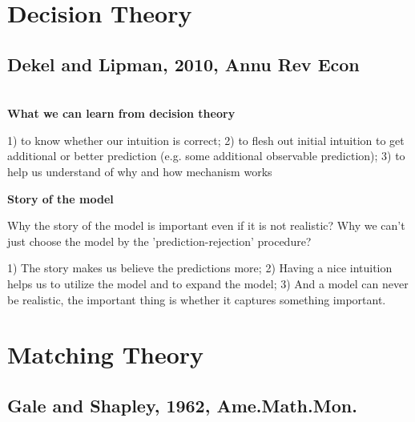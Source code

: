 \documentclass{book}
\theoremstyle{plain}
\theoremstyle{definition}
\begin{document}








\chapter{Decision Theory} %
\label{cha:decision_theory}

\section{Dekel and Lipman, 2010, Annu Rev Econ} %
\label{sec:dekel_and_lipman_2010_annu_rev_econ}

\textbf{}\\

\noindent
\textbf{What we can learn from decision theory}

1) to know whether our intuition is correct;
2) to flesh out initial intuition to get additional or better prediction (e.g. some additional observable prediction);
3) to help us understand of why and how mechanism works

\noindent
\textbf{Story of the model}

Why the story of the model is important even if it is not realistic? Why we can't just choose the model by the 'prediction-rejection' procedure?

1) The story makes us believe the predictions more;
2) Having a nice intuition helps us to utilize the model and to expand the model;
3) And a model can never be realistic, the important thing is whether it captures something important.




\chapter{Matching Theory} %
\label{cha:matching_theory}

\section{Gale and Shapley, 1962, Ame.Math.Mon.} %
\label{sec:gale_and_shapley_1962}

\textbf{}
\end{document}
